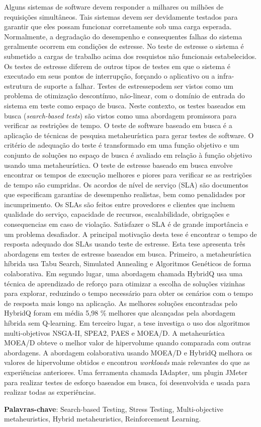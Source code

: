 
\begin{resumo} 
 
Alguns sistemas de software devem responder a milhares ou milhões de requisições simultâneos. Tais sistemas devem ser devidamente testados para garantir que eles possam funcionar corretamente sob uma carga esperada. Normalmente, a degradação do desempenho e consequentes falhas do sistema geralmente ocorrem em condições de estresse. No teste de estresse o sistema é submetido a cargas de trabalho acima dos resquistos não funcionais estabelecidos. Os testes de estresse diferem de outros tipos de testes em que o sistema é executado em seus pontos de interrupção, forçando o aplicativo ou a infra-estrutura de suporte a falhar. Testes de estressepodem ser vistos como um problema de otimização descontínuo, não-linear, com o domínio de entrada do sistema em teste como espaço de busca. Neste contexto, os testes baseados em busca (\textit{search-based tests}) são vistos como uma abordagem promissora para verificar as restrições de tempo. O teste de software baseado em busca é a aplicação de técnicas de pesquisa metaheurística para gerar testes de software. O critério de adequação do teste é transformado em uma função objetivo e um conjunto de soluções no espaço de busca é avaliado em relação à função objetivo usando uma metaheurística. O teste de estresse baseado em busca envolve encontrar os tempos de execução melhores e piores para verificar se as restrições de tempo são cumpridas. Os acordos de nível de serviço (SLA) são documentos que especificam garantias de desempenho realistas, bem como penalidades por incumprimento. Os SLAs são feitos entre provedores e clientes que incluem qualidade do serviço, capacidade de recursos, escalabilidade, obrigações e consequencias em caso de violação. Satisfazer o SLA é de grande importância e um problema desafiador. A principal motivação desta tese é encontrar o tempo de resposta adequado dos SLAs usando teste de estresse. Esta tese apresenta três abordagens em testes de estresse baseados em busca. Primeiro, a metaheurística híbrida usa Tabu Search, Simulated Annealing e Algoritmos Genéticos de forma colaborativa. Em segundo lugar, uma abordagem chamada HybridQ usa uma técnica de aprendizado de reforço para otimizar a escolha de soluções vizinhas para explorar, reduzindo o tempo necessário para obter os cenários com o tempo de resposta mais longo na aplicação. As melhores soluções encontradas pelo HybridQ foram em média 5,98 \% melhores que alcançadas pela abordagem híbrida sem Q-learning. Em terceiro lugar, a tese investiga o uso dos algoritmos multi-objetivos NSGA-II, SPEA2, PAES e MOEA/D. A metaheurística MOEA/D obteve o melhor valor de hipervolume quando comparada com outras abordagens. A abordagem colaborativa usando MOEA/D e HybridQ melhora os valores de hipervolume obtidos e encontrou \textit{workloads} mais relevantes do que as experiências anteriores. Uma ferramenta chamada IAdapter, um plugin JMeter para realizar testes de esforço baseados em busca, foi desenvolvida e usada para realizar todas as experiências.

\textbf{Palavras-chave}: Search-based Testing, Stress Testing, Multi-objective metaheuristics, Hybrid metaheuristics, Reinforcement Learning.

\end{resumo}


